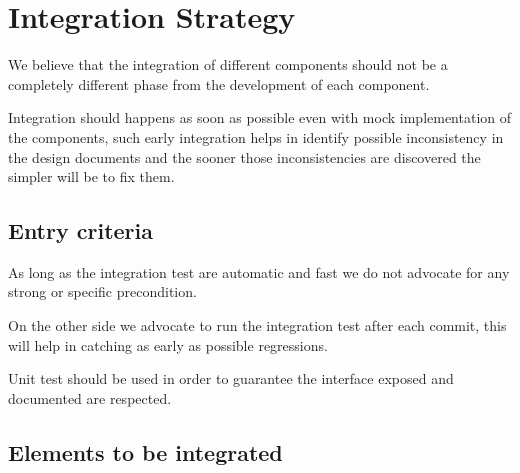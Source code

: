 \documentclass[11pt]{article} %
\begin{document}
\newpage
\section{Integration Strategy}

We believe that the integration of different components should not be a completely different phase from the development of each component.

Integration should happens as soon as possible even with mock implementation of the components, such early integration helps in identify possible inconsistency in the design documents and the sooner those inconsistencies are discovered the simpler will be to fix them.

\subsection{Entry criteria}

As long as the integration test are automatic and fast we do not advocate for any strong or specific precondition.

On the other side we advocate to run the integration test after each commit, this will help in catching as early as possible regressions.

Unit test should be used in order to guarantee the interface exposed and documented are respected.

\subsection{Elements to be integrated}
\end{document}
